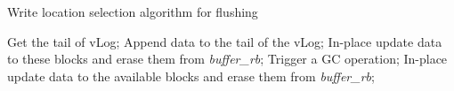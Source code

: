 \documentclass[sigconf]{acmart}
\begin{document}
\begin{algorithm}[htbp]
	\caption{Write location selection algorithm for flushing}
	\begin{algorithmic}[1]
		\STATE Get the tail of vLog; 
		\STATE Append data to the tail of the vLog;
		\ELSE
		\STATE In-place update data to these blocks and erase them from \textit{buffer\_rb};
		\ELSE
		\STATE Trigger a GC operation; 
		\STATE In-place update data to the available blocks and erase them from \textit{buffer\_rb};
		\ENDIF
		\ENDIF			
	\end{algorithmic}
	\label{alg:reuse}
\end{algorithm}
 
\end{document}
